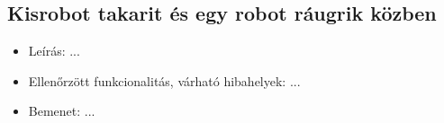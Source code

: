 \subsection{Kisrobot takarit és egy robot ráugrik közben }
\begin{itemize}
	\item Leírás: \newline
	...
	\item Ellenőrzött funkcionalitás, várható hibahelyek: \newline
	...
	\item Bemenet: \newline
	... \newline
\end{itemize}